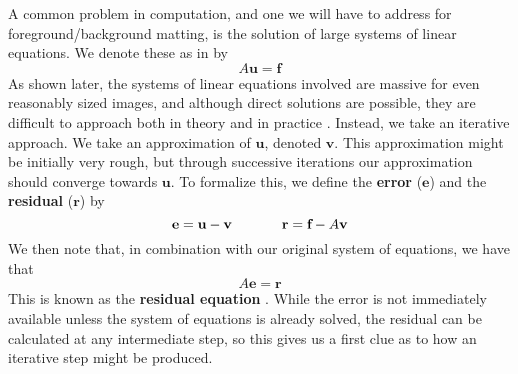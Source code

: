 A common problem in computation, and one we will have to address for foreground/background matting, is the solution of large systems of linear equations. We denote these as in \cite{briggs87} by
\[A\textbf{u}=\textbf{f}\]
As shown later, the systems of linear equations involved are massive for even reasonably sized images, and although direct solutions are possible, they are difficult to approach both in theory \cite[pg.4]{briggs87} and in practice \cite{lee14}. Instead, we take an iterative approach. We take an approximation of $\textbf{u}$, denoted $\textbf{v}$. This approximation might be initially very rough, but through successive iterations our approximation should converge towards $\textbf{u}$. To formalize this, we define the \textbf{error} ($\textbf{e}$) and the \textbf{residual} ($\textbf{r}$) by
\[\textbf{e}=\textbf{u}-\textbf{v}\hspace{.5in}
  \textbf{r}=\textbf{f}-A\textbf{v}\]
We then note that, in combination with our original system of equations, we have that
\[A\textbf{e}=\textbf{r}\]
This is known as the \textbf{residual equation} \cite{briggs87}. While the error is not immediately available unless the system of equations is already solved, the residual can be calculated at any intermediate step, so this gives us a first clue as to how an iterative step might be produced.